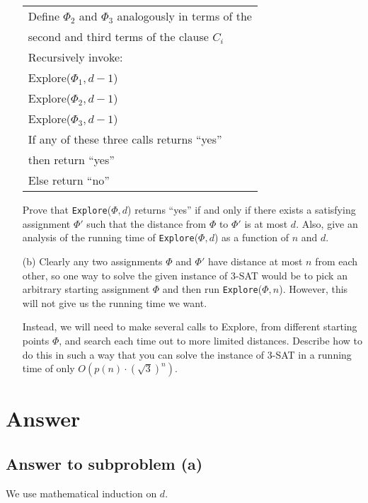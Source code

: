 \documentclass[12pt,letterpaper]{article}
\begin{document}
\begin{itemize}
\begin{table}[h!]
{\begin{tabular}{l}
\hspace{4em}Define $\Phi_2$ and $\Phi_3$ analogously in terms of the\\
\hspace{6em}second and third terms of the clause $C_i$\\
\hspace{4em}Recursively invoke:\\
\hspace{6em}Explore($\Phi_1, d-1$)\\
\hspace{6em}Explore($\Phi_2, d-1$)\\
\hspace{6em}Explore($\Phi_3, d-1$)\\
\hspace{4em}If any of these three calls returns ``yes''\\
\hspace{6em}then return ``yes''\\
\hspace{4em}Else return ``no''\\
\hline
\end{tabular}
}
\end{table}

Prove that {\tt Explore}($\Phi, d$) returns ``yes'' if and only if there exists
a satisfying assignment $\Phi'$ such that the distance from $\Phi$ to $\Phi'$ is at
most $d$. Also, give an analysis of the running time of {\tt Explore}($\Phi, d$)
as a function of $n$ and $d$.

\item[(b)] Clearly any two assignments $\Phi$ and $\Phi'$ have distance at most $n$
from each other, so one way to solve the given instance of 3-SAT
would be to pick an arbitrary starting assignment $\Phi$ and then run
{\tt Explore}($\Phi, n$). However, this will not give us the running time we
want.

Instead, we will need to make several calls to Explore, from
different starting points $\Phi$, and search each time out to more limited
distances. Describe how to do this in such a way that you can solve
the instance of 3-SAT in a running time of only $O(p(n)\cdot(\sqrt{3})^n)$.
\end{itemize}

\section*{Answer}
\subsection*{Answer to subproblem (a)}
We use mathematical induction on $d$.
\end{document}
